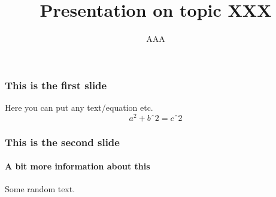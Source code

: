 \documentclass[10pt]{beamer}
\title{Presentation on  topic XXX}
\author{AAA}
\begin{document}
    \maketitle
    \begin{frame}
	    \frametitle{This is the first slide}
		Here you can put any text/equation etc. 
        \begin{equation}
            a^2 + bˆ2 = cˆ2
        \end{equation}
    \end{frame}
	\begin{frame}
		\frametitle{This is the second slide}
		\framesubtitle{A bit more information about this}
		Some random text.		
    \end{frame}
\end{document}
